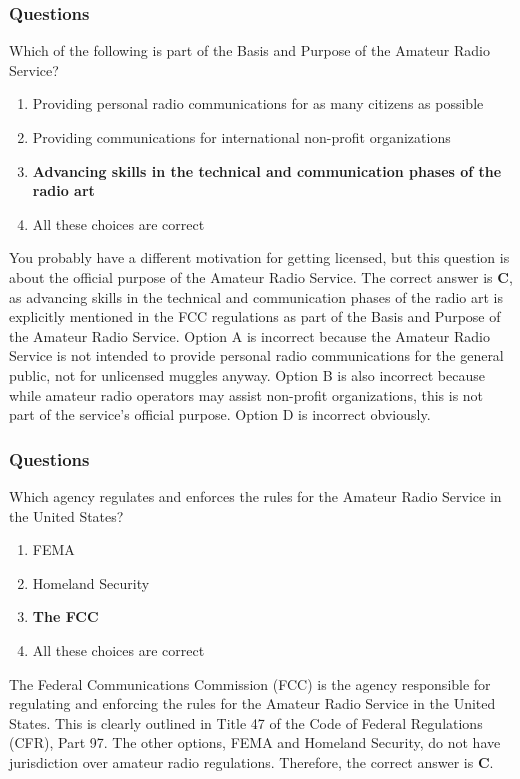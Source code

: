 \subsubsection*{Questions}
\begin{tcolorbox}[colback=gray!10!white,colframe=black!75!black,title={T1A01}]
    Which of the following is part of the Basis and Purpose of the Amateur Radio Service?
    \begin{enumerate}[label=\Alph*),noitemsep]
        \item Providing personal radio communications for as many citizens as possible
        \item Providing communications for international non-profit organizations
        \item \textbf{Advancing skills in the technical and communication phases of the radio art}
        \item All these choices are correct
    \end{enumerate}
\end{tcolorbox}

You probably have a different motivation for getting licensed, but this question is about the official purpose of the Amateur Radio Service.
The correct answer is \textbf{C}, as advancing skills in the technical and communication phases of the radio art is explicitly mentioned in the FCC regulations as part of the Basis and Purpose of the Amateur Radio Service. Option A is incorrect because the Amateur Radio Service is not intended to provide personal radio communications for the general public, not for unlicensed muggles anyway. Option B is also incorrect because while amateur radio operators may assist non-profit organizations, this is not part of the service's official purpose. Option D is incorrect obviously.



\subsubsection*{Questions}

\begin{tcolorbox}[colback=gray!10!white,colframe=black!75!black,title={T1A02}]
    Which agency regulates and enforces the rules for the Amateur Radio Service in the United States?
    \begin{enumerate}[label=\Alph*),noitemsep]
        \item FEMA
        \item Homeland Security
        \item \textbf{The FCC}
        \item All these choices are correct
    \end{enumerate}
\end{tcolorbox}

The Federal Communications Commission (FCC) is the agency responsible for regulating and enforcing the rules for the Amateur Radio Service in the United States. This is clearly outlined in Title 47 of the Code of Federal Regulations (CFR), Part 97. The other options, FEMA and Homeland Security, do not have jurisdiction over amateur radio regulations. Therefore, the correct answer is \textbf{C}.

